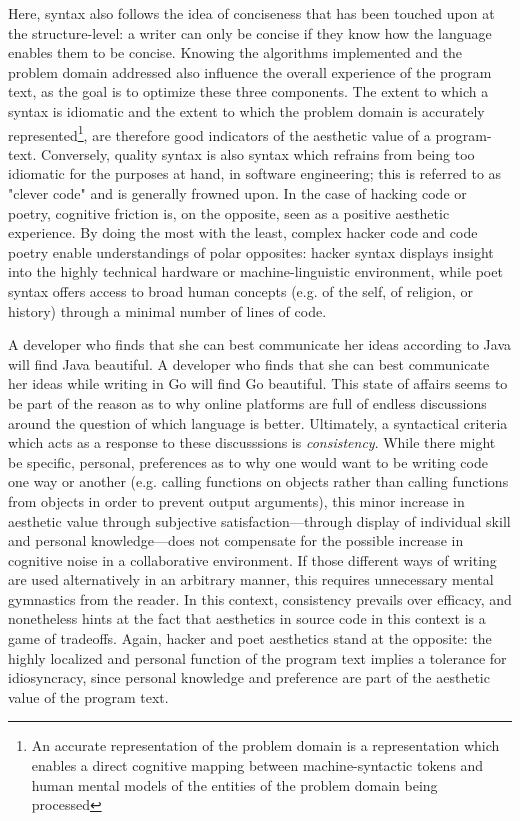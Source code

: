 Here, syntax also follows the idea of conciseness that has been touched upon at the structure-level: a writer can only be concise if they know how the language enables them to be concise. Knowing the algorithms implemented and the problem domain addressed also influence the overall experience of the program text, as the goal is to optimize these three components. The extent to which a syntax is idiomatic and the extent to which the problem domain is accurately represented\footnote{An accurate representation of the problem domain is a representation which enables a direct cognitive mapping between machine-syntactic tokens and human mental models of the entities of the problem domain being processed}, are therefore good indicators of the aesthetic value of a program-text. Conversely, quality syntax is also syntax which refrains from being too idiomatic for the purposes at hand, in software engineering; this is referred to as "clever code" and is generally frowned upon. In the case of hacking code or poetry, cognitive friction is, on the opposite, seen as a positive aesthetic experience. By doing the most with the least, complex hacker code and code poetry enable understandings of polar opposites: hacker syntax displays insight into the highly technical hardware or machine-linguistic environment, while poet syntax offers access to broad human concepts (e.g. of the self, of religion, or history) through a minimal number of lines of code.

A developer who finds that she can best communicate her ideas according to Java will find Java beautiful. A developer who finds that she can best communicate her ideas while writing in Go will find Go beautiful. This state of affairs seems to be part of the reason as to why online platforms are full of endless discussions around the question of which language is better. Ultimately, a syntactical criteria which acts as a response to these discusssions is \emph{consistency}. While there might be specific, personal, preferences as to why one would want to be writing code one way or another (e.g. calling functions on objects rather than calling functions from objects in order to prevent output arguments), this minor increase in aesthetic value through subjective satisfaction—through display of individual skill and personal knowledge—does not compensate for the possible increase in cognitive noise in a collaborative environment. If those different ways of writing are used alternatively in an arbitrary manner, this requires unnecessary mental gymnastics from the reader. In this context, consistency prevails over efficacy, and nonetheless hints at the fact that aesthetics in source code in this context is a game of tradeoffs. Again, hacker and poet aesthetics stand at the opposite: the highly localized and personal function of the program text implies a tolerance for idiosyncracy, since personal knowledge and preference are part of the aesthetic value of the program text.

